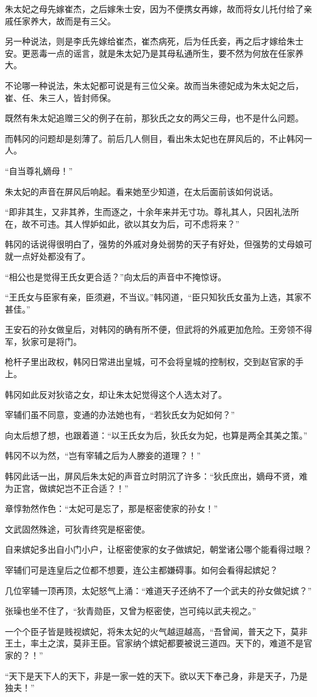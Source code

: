 朱太妃之母先嫁崔杰，之后嫁朱士安，因为不便携女再嫁，故而将女儿托付给了亲戚任家养大，故而是有三父。

另一种说法，则是李氏先嫁给崔杰，崔杰病死，后为任氏妾，再之后才嫁给朱士安。更恶毒一点的谣言，就是朱太妃乃是其母私通所生，要不然为何放在任家养大。

不论哪一种说法，朱太妃都可说是有三位父亲。故而当朱德妃成为朱太妃之后，崔、任、朱三人，皆封师保。

既然有朱太妃追赠三父的例子在前，那狄氏之女的两父三母，也不是什么问题。

而韩冈的问题却是刻薄了。前后几人侧目，看出朱太妃也在屏风后的，不止韩冈一人。

“自当尊礼嫡母！”

朱太妃的声音在屏风后响起。看来她至少知道，在太后面前该如何说话。

“即非其生，又非其养，生而逐之，十余年来并无寸功。尊礼其人，只因礼法所在，故不可违。其人悍妒如此，欲以其女为后，可不虑将来？”

韩冈的话说得很明白了，强势的外戚对身处弱势的天子有好处，但强势的丈母娘可就一点好处都没有了。

“相公也是觉得王氏女更合适？”向太后的声音中不掩惊讶。

“王氏女与臣家有亲，臣须避，不当议。”韩冈道，“臣只知狄氏女虽为上选，其家不甚佳。”

王安石的孙女做皇后，对韩冈的确有所不便，但武将的外戚更加危险。王旁领不得军，狄家可是将门。

枪杆子里出政权，韩冈日常进出皇城，可不会将皇城的控制权，交到赵官家的手上。

韩冈如此反对狄谘之女，却让朱太妃觉得这个人选太对了。

宰辅们虽不同意，变通的办法她也有，“若狄氏女为妃如何？”

向太后想了想，也跟着道：“以王氏女为后，狄氏女为妃，也算是两全其美之策。”

韩冈不以为然，“岂有宰辅之后为人滕妾的道理？！”

韩冈此话一出，屏风后朱太妃的声音立时阴沉了许多：“狄氏庶出，嫡母不贤，难为正宫，做嫔妃岂不正合适？！”

章惇勃然作色：“太妃可是忘了，那是枢密使家的孙女！”

文武固然殊途，可狄青终究是枢密使。

自来嫔妃多出自小门小户，让枢密使家的女子做嫔妃，朝堂诸公哪个能看得过眼？

宰辅们可是连皇后之位都不想要，连公主都嫌碍事。如何会看得起嫔妃？

几位宰辅一顶再顶，太妃怒气上涌：“难道天子还纳不了一个武夫的孙女做妃嫔？”

张璪也坐不住了，“狄青勋臣，又曾为枢密使，岂可纯以武夫视之。”

一个个臣子皆是贱视嫔妃，将朱太妃的火气越逗越高，“吾曾闻，普天之下，莫非王土，率土之滨，莫非王臣。官家纳个嫔妃都要被说三道四。天下的，难道不是官家的？！”

“天下是天下人的天下，非是一家一姓的天下。欲以天下奉己身，非是天子，乃是独夫！”
